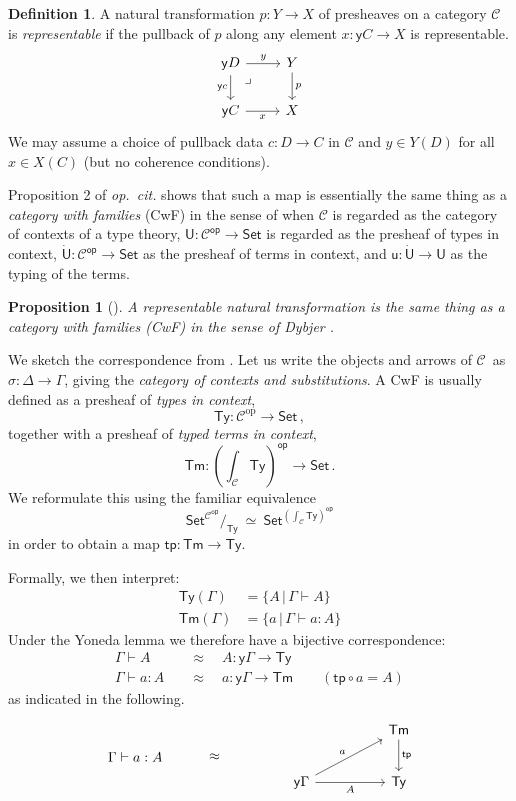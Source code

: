 \documentclass[12pt,reqno]{amsart}
\newcommand{\CC}{\ensuremath{\mathcal{C}}}
\newcommand{\op}[1]{\ensuremath{{#1}^{\mathsf{op}}}}
\newcommand{\pshx}[1]{\ensuremath{\mathsf{Set}^{\op{#1}}}}
\newcommand{\Set}{\ensuremath{\mathsf{Set}}}
\newcommand{\y}{\ensuremath{\mathsf{y}}} %
\newcommand{\tp}{\ensuremath{\mathsf{tp}}}
\newcommand{\Tm}{\ensuremath{\mathsf{Tm}}}
\newcommand{\Ty}{\ensuremath{\mathsf{Ty}}}
\renewcommand{\to}{\ensuremath{\rightarrow}}
\newcommand{\terms}[2]{#1 \vdash #2}
\newcommand{\Gterms}[1]{\terms{\Gamma}{#1}}
\renewcommand{\t}{\ensuremath{\mathsf{u}}}
\newcommand{\T}{\ensuremath{\mathsf{U}}}
\newcommand{\TT}{\ensuremath{\dot{\mathsf{U}}}}
\newcommand{\pbcorner}{\arrow[dr,phantom,"\lrcorner" very near start, shift right=.5ex]} %
\newtheorem{proposition}[theorem]{Proposition}
\theoremstyle{remark}
\theoremstyle{definition}
\newtheorem{definition}[theorem]{Definition}
\begin{document}
\begin{definition}\label{def:representablenattrans} A natural transformation $p : Y \to X$ of presheaves on a category $\CC$  is \emph{representable} if the pullback of $p$ along any element $x: \y{C} \to X$ is representable.
\begin{equation*}
\begin{tikzcd}
 \y{D} \ar[d,swap,"{\y{c}}"] \ar[r,"y"] \pbcorner &  Y \ar[d, "p"]\\
\y{C} \ar[r,swap,"x"]  & X
\end{tikzcd}
\end{equation*}
We may assume a choice of pullback data $c : D \to C$ in $\CC$ and $y \in Y(D)$ for all $x\in X(C)$ (but no coherence conditions).
\end{definition}

Proposition 2 of \emph{op.\ cit.} shows that such a map is essentially the same thing as a \emph{category with families} (CwF) in the sense of \cite{Dybjer:CWF} when $\CC$ is regarded as the category of contexts of a type theory, $\T: \op{\CC} \to \Set$ is regarded as the presheaf of types in context, $\TT: \op{\CC} \to \Set$ as the presheaf of terms in context, and $\t : \TT\to\T$ as the typing of the terms.   

\begin{proposition}[\cite{awodey:NM, Fiore:2012}] A representable natural transformation is the same thing as a \emph{category with families (CwF)} in the sense of Dybjer \cite{Dybjer:CWF}.
\end{proposition}

We sketch the correspondence from \cite{awodey:NM}.
Let us write the objects and arrows of \CC\ as $\sigma : \Delta \to \Gamma$, giving the \emph{category of contexts and substitutions}.
A CwF is usually defined as a presheaf of \emph{types in context}, 
\[
\Ty : \CC^{\mathrm{op}}\to \Set\,,
\]
together with a presheaf of \emph{typed terms in context}, 
\[
\Tm : {\textstyle (\int_{\CC}\!\Ty)^{\mathsf{op}}\to \Set }\,.
\]
We reformulate this using the familiar equivalence
\[\textstyle
 \pshx{\CC}\!/_{\Ty}\ \simeq\ \pshx{(\int_{\CC}\Ty)}
\]
in order to obtain a map $\tp :\Tm \to \Ty$.


Formally, we then interpret:
\begin{align*}
 \Ty(\Gamma) &= \{ A \,|\, \Gamma \vdash A\} \\
 \Tm(\Gamma) &= \{ a \,|\, \Gamma \vdash a:A\} 
\end{align*}
Under the Yoneda lemma we therefore have a bijective correspondence:
\begin{align*}
\Gamma\vdash A\quad &\approx\quad A : \y{\Gamma}\to \Ty  \\
\Gterms{a:A}\quad &\approx\quad  a: \y{\Gamma}\to \Tm  \qquad (\tp\circ a = A)
\end{align*}
as indicated in the following.
\[
\begin{tikzcd}
 \strut \ar[d, phantom,"\Gamma \vdash a:A"] && \strut \ar[d, phantom,"\approx"] &&  && {\Tm} \ar[d,"{\tp}"]\\
\strut && \strut && \y\Gamma \ar[rru, "a"]   \ar[rr ,swap,  "A"]   && {\Ty}
\end{tikzcd}
\]
%
\end{document}
